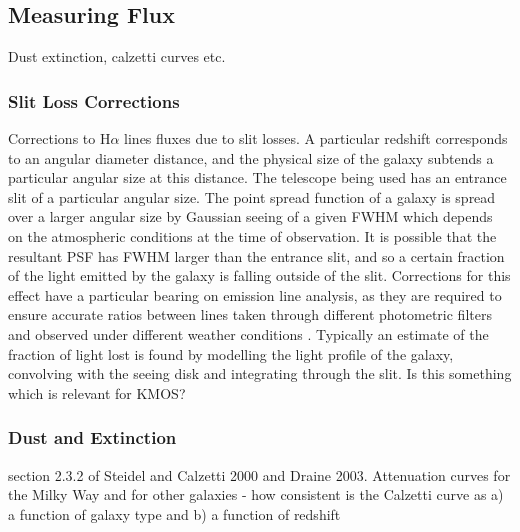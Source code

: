 \documentclass{literature}
\begin{document}
\subsection{Measuring Flux}
Dust extinction, calzetti curves etc. 

 

\subsubsection{Slit Loss Corrections}
Corrections to H$\alpha$ lines fluxes due to slit losses. A particular redshift corresponds to an angular diameter distance, and the physical size of the galaxy subtends a particular angular size at this distance. The telescope being used has an entrance slit of a particular angular size. The point spread function of a galaxy is spread over a larger angular size by Gaussian seeing of a given FWHM which depends on the atmospheric conditions at the time of observation. It is possible that the resultant PSF has FWHM larger than the entrance slit, and so a certain fraction of the light emitted by the galaxy is falling outside of the slit. Corrections for this effect have a particular bearing on emission line analysis, as they are required to ensure accurate ratios between lines taken through different photometric filters and observed under different weather conditions \citep{Reddy2015}. Typically an estimate of the fraction of light lost is found by modelling the light profile of the galaxy, convolving with the seeing disk and integrating through the slit. Is this something which is relevant for KMOS?     


\subsubsection{Dust and Extinction}
section 2.3.2 of Steidel and Calzetti 2000 and Draine 2003. Attenuation curves for the Milky Way and for other galaxies - how consistent is the Calzetti curve as a) a function of galaxy type and b) a function of redshift 
\end{document}
